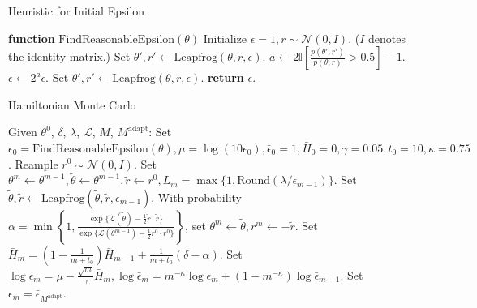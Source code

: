 \documentclass{beamer}
\begin{document}
\begin{frame}{Heuristic for Initial Epsilon}
    \setcounter{algorithm}{3} %
    
    \begin{algorithm}[H]
    \caption{Heuristic for choosing an initial value of $\epsilon$}
    \begin{algorithmic}
    \STATE \textbf{function} $\text{FindReasonableEpsilon}(\theta)$
    \STATE Initialize $\epsilon = 1, r \sim \mathcal{N}(0, I)$. ($I$ denotes the identity matrix.)
    \STATE Set $\theta', r' \gets \text{Leapfrog}(\theta, r, \epsilon)$.
    \STATE $a \gets 2\mathbb{I}\left[\frac{p(\theta', r')}{p(\theta, r)} > 0.5\right] - 1$.
        \STATE $\epsilon \gets 2^a \epsilon$.
        \STATE Set $\theta', r' \gets \text{Leapfrog}(\theta, r, \epsilon)$.
    \ENDWHILE
    \STATE \textbf{return} $\epsilon$.
    \end{algorithmic}
    \end{algorithm}
\end{frame}

\begin{frame}{Hamiltonian Monte Carlo}
    \setcounter{algorithm}{4} %
    
    \begin{algorithm}[H]
    \footnotesize %
    \caption{Hamiltonian Monte Carlo with Dual Averaging}
    \begin{algorithmic}
    \STATE Given $\theta^0$, $\delta$, $\lambda$, $\mathcal{L}$, $M$, $M^{\text{adapt}}$:
    \STATE Set $\epsilon_0 = \text{FindReasonableEpsilon}(\theta), \mu = \log(10\epsilon_0), \bar{\epsilon}_0 = 1, \bar{H}_0 = 0, \gamma = 0.05, t_0 = 10, \kappa = 0.75$.
        \STATE Reample $r^0 \sim \mathcal{N}(0, I)$.
        \STATE Set $\theta^m \gets \theta^{m-1}, \tilde{\theta} \gets \theta^{m-1}, \tilde{r} \gets r^0, L_m = \max\{1, \text{Round}(\lambda/\epsilon_{m-1})\}$.
            \STATE Set $\tilde{\theta}, \tilde{r} \gets \text{Leapfrog}(\tilde{\theta}, \tilde{r}, \epsilon_{m-1})$.
        \ENDFOR
        \STATE With probability $\alpha = \min \left\{1, \frac{\exp\{\mathcal{L}(\tilde{\theta}) - \frac{1}{2}\tilde{r} \cdot \tilde{r}\}}{\exp\{\mathcal{L}(\theta^{m-1}) - \frac{1}{2}r^0 \cdot r^0\}}\right\}$, set $\theta^m \gets \tilde{\theta}, r^m \gets -\tilde{r}$.
            \STATE Set $\bar{H}_m = \left(1 - \frac{1}{m+t_0}\right) \bar{H}_{m-1} + \frac{1}{m+t_0}(\delta - \alpha)$.
            \STATE Set $\log \epsilon_m = \mu - \frac{\sqrt{m}}{\gamma}\bar{H}_m, \log \bar{\epsilon}_m = m^{-\kappa} \log \epsilon_m + (1 - m^{-\kappa}) \log \bar{\epsilon}_{m-1}$.
        \ELSE
            \STATE Set $\epsilon_m = \bar{\epsilon}_{M^{\text{adapt}}}$.
        \ENDIF
    \ENDFOR
    \end{algorithmic}
    \end{algorithm}
\end{frame}
\end{document}
